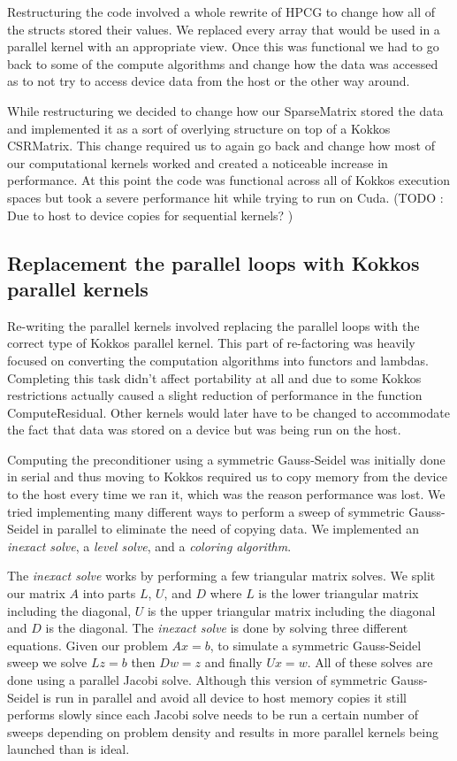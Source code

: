 \documentclass{ccr15}
\begin{document}
Restructuring the code involved a whole rewrite of HPCG to change how all of the structs stored
their values. We replaced every array that would be used in a parallel kernel with an appropriate
view. Once this was functional we had to go back to some of the compute algorithms and change
how the data was accessed as to not try to access device data from the host or the
other way around.

While restructuring we decided to change how our SparseMatrix stored the data and implemented it
as a sort of overlying structure on top of a Kokkos CSRMatrix. This change required us to again
go back and change how most of our computational kernels worked and created a noticeable increase
in performance. At this point the code was functional across all of Kokkos execution spaces but
took a severe performance hit while trying to run on Cuda. (TODO : Due to host to device copies for sequential kernels? )

\subsection{Replacement the parallel loops with Kokkos parallel kernels}

Re-writing the parallel kernels involved replacing the parallel loops with the correct type of
Kokkos parallel kernel. This part of re-factoring was heavily focused on converting the
computation algorithms into functors and lambdas. Completing this task didn't affect portability
at all and due to some Kokkos restrictions actually caused a slight reduction of performance in
the function ComputeResidual. Other kernels would later have to be changed to accommodate the fact
that data was stored on a device but was being run on the host.

Computing the preconditioner using a symmetric Gauss-Seidel was initially done in serial and thus
moving to Kokkos required us to copy memory from the device to the host every time we ran it,
which was the reason performance was lost. We tried implementing many different ways to perform
a sweep of symmetric Gauss-Seidel in parallel to eliminate the need of copying data. We
implemented an \emph{inexact solve}, a \emph{level solve}, and a \emph{coloring algorithm}.


The \emph{inexact solve} works by performing a few triangular matrix solves. We split our matrix $A$ into
parts $L$, $U$, and $D$ where $L$ is the lower triangular matrix including the diagonal, $U$ is the upper
triangular matrix including the diagonal and $D$ is the diagonal. The \emph{inexact solve} is done by solving three
different equations. Given our problem $A x = b$, to simulate a symmetric Gauss-Seidel sweep we solve
$L z = b$ then $D w = z$ and finally $U x = w$. All of these solves are done using a parallel Jacobi solve.
Although this version of symmetric Gauss-Seidel is run in parallel and avoid all device to host memory
copies it still performs slowly since each Jacobi solve needs to be run a certain number of sweeps depending
on problem density and results in more parallel kernels being launched than is ideal.
\end{document}
